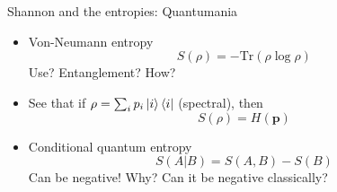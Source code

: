 \documentclass[handout]{beamer}
\begin{document}
\begin{frame}{Shannon and the entropies: Quantumania}
    \begin{itemize}
        \item Von-Neumann entropy
        \begin{equation}
            S(\rho) = -\text{Tr}(\rho\log{\rho})
        \end{equation}\pause 
        Use? Entanglement? How?\pause 
        \item See that if $\rho = \sum_i p_i\ket{i}\bra{i}$ (spectral), then
        \begin{equation}
            S(\rho) = H(\mathbf{p})
        \end{equation}\pause 
        \item Conditional quantum entropy
        \begin{equation}
            S(A|B) = S(A,B) - S(B)
        \end{equation}\pause 
        Can be negative! Why? Can it be negative classically?
    \end{itemize}
\end{frame}
\end{document}
